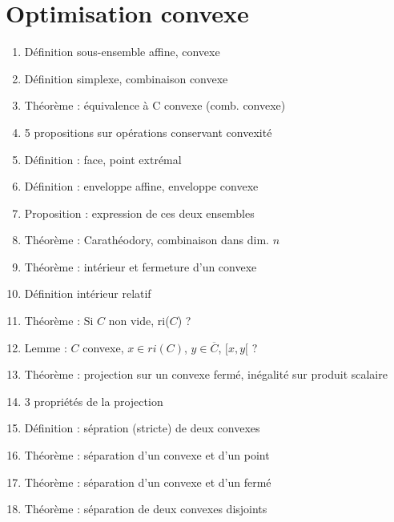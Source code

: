 \documentclass{article}
\begin{document}
\part{Optimisation convexe}
\begin{enumerate}
\section{Ensembles convexes}
	\item Définition sous-ensemble affine, convexe
	\item Définition simplexe, combinaison convexe
	\item Théorème : équivalence à C convexe (comb. convexe)
	\item 5 propositions sur opérations conservant convexité
	\item Définition : face, point extrémal
	\item Définition : enveloppe affine, enveloppe convexe
	\item Proposition : expression de ces deux ensembles
	\item Théorème : Carathéodory, combinaison dans dim. $n$
	\item Théorème : intérieur et fermeture d'un convexe
	\item Définition intérieur relatif
	\item Théorème : Si $C$ non vide, ri($C$) ?
	\item Lemme : $C$ convexe, $x\in ri(C)$, $y\in\overline{C}$, $[x,y[$ ?
	\item Théorème : projection sur un convexe fermé, inégalité sur produit scalaire
	\item 3 propriétés de la projection
	\item Définition : sépration (stricte) de deux convexes
	\item Théorème : séparation d'un convexe et d'un point
	\item Théorème : séparation d'un convexe et d'un fermé
	\item Théorème : séparation de deux convexes disjoints
\end{enumerate}
\end{document}
